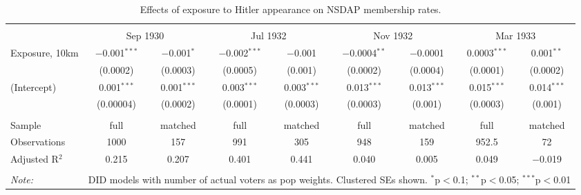 
\begin{table}[!htbp] \centering 
  \caption{Effects of exposure to Hitler appearance on NSDAP membership rates.\vspace{-.25cm}} 
  \label{tab:nsdap-members-dd} 
\scriptsize 
\begin{tabular}{@{\extracolsep{5pt}}lcccccccc} 
\\[-1.8ex]\hline 
\hline \\[-1.8ex] 
 & \multicolumn{2}{c}{Sep 1930} & \multicolumn{2}{c}{Jul 1932} & \multicolumn{2}{c}{Nov 1932} & \multicolumn{2}{c}{Mar 1933} \\ 
 \cmidrule(r){2-3}\cmidrule(r){4-5}\cmidrule(r){6-7}\cmidrule(r){8-9}Exposure, 10km & $-$0.001$^{***}$ & $-$0.001$^{*}$ & $-$0.002$^{***}$ & $-$0.001 & $-$0.0004$^{**}$ & $-$0.0001 & 0.0003$^{***}$ & 0.001$^{**}$ \\ 
  & (0.0002) & (0.0003) & (0.0005) & (0.001) & (0.0002) & (0.0004) & (0.0001) & (0.0002) \\ 
  (Intercept) & 0.001$^{***}$ & 0.001$^{***}$ & 0.003$^{***}$ & 0.003$^{***}$ & 0.013$^{***}$ & 0.013$^{***}$ & 0.015$^{***}$ & 0.014$^{***}$ \\ 
  & (0.00004) & (0.0002) & (0.0001) & (0.0003) & (0.0003) & (0.001) & (0.0003) & (0.001) \\ 
 \hline \\[-1.8ex] 
Sample & full & matched & full & matched & full & matched & full & matched \\ 
Observations & 1000 & 157 & 991 & 305 & 948 & 159 & 952.5 & 72 \\ 
Adjusted R$^{2}$ & 0.215 & 0.207 & 0.401 & 0.441 & 0.040 & 0.005 & 0.049 & $-$0.019 \\ 
\hline 
\hline \\[-1.8ex] 
\textit{Note:}  & \multicolumn{8}{r}{DID models with number of actual voters as pop weights. Clustered SEs shown. $^{*}$p$<$0.1; $^{**}$p$<$0.05; $^{***}$p$<$0.01} \\ 
\end{tabular} 
\end{table} 
